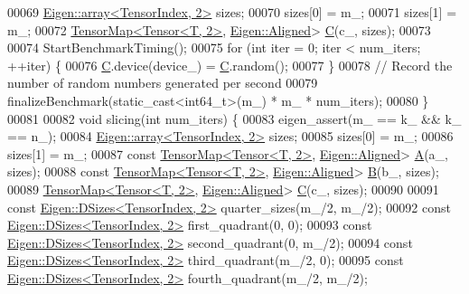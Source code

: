 \begin{DoxyCode}
00069     \hyperlink{class_eigen_1_1array}{Eigen::array<TensorIndex, 2>} sizes;
00070     sizes[0] = m\_;
00071     sizes[1] = m\_;
00072     \hyperlink{class_eigen_1_1_tensor_map}{TensorMap<Tensor<T, 2>}, \hyperlink{group__enums_gga45fe06e29902b7a2773de05ba27b47a1ad37d4c71425bb286e9b4103830538fbf}{Eigen::Aligned}> 
      \hyperlink{group___core___module}{C}(c\_, sizes);
00073 
00074     StartBenchmarkTiming();
00075     \textcolor{keywordflow}{for} (\textcolor{keywordtype}{int} iter = 0; iter < num\_iters; ++iter) \{
00076       \hyperlink{group___core___module}{C}.device(device\_) = \hyperlink{group___core___module}{C}.random();
00077     \}
00078     \textcolor{comment}{// Record the number of random numbers generated per second}
00079     finalizeBenchmark(static\_cast<int64\_t>(m\_) * m\_ * num\_iters);
00080   \}
00081 
00082   \textcolor{keywordtype}{void} slicing(\textcolor{keywordtype}{int} num\_iters) \{
00083     eigen\_assert(m\_ == k\_ && k\_ == n\_);
00084     \hyperlink{class_eigen_1_1array}{Eigen::array<TensorIndex, 2>} sizes;
00085     sizes[0] = m\_;
00086     sizes[1] = m\_;
00087     \textcolor{keyword}{const} \hyperlink{class_eigen_1_1_tensor_map}{TensorMap<Tensor<T, 2>}, \hyperlink{group__enums_gga45fe06e29902b7a2773de05ba27b47a1ad37d4c71425bb286e9b4103830538fbf}{Eigen::Aligned}> 
      \hyperlink{group___core___module_class_eigen_1_1_matrix}{A}(a\_, sizes);
00088     \textcolor{keyword}{const} \hyperlink{class_eigen_1_1_tensor_map}{TensorMap<Tensor<T, 2>}, \hyperlink{group__enums_gga45fe06e29902b7a2773de05ba27b47a1ad37d4c71425bb286e9b4103830538fbf}{Eigen::Aligned}> 
      \hyperlink{group___core___module_class_eigen_1_1_matrix}{B}(b\_, sizes);
00089     \hyperlink{class_eigen_1_1_tensor_map}{TensorMap<Tensor<T, 2>}, \hyperlink{group__enums_gga45fe06e29902b7a2773de05ba27b47a1ad37d4c71425bb286e9b4103830538fbf}{Eigen::Aligned}> 
      \hyperlink{group___core___module}{C}(c\_, sizes);
00090 
00091     \textcolor{keyword}{const} \hyperlink{struct_eigen_1_1_d_sizes}{Eigen::DSizes<TensorIndex, 2>} quarter\_sizes(m\_/2, m\_/2);
00092     \textcolor{keyword}{const} \hyperlink{struct_eigen_1_1_d_sizes}{Eigen::DSizes<TensorIndex, 2>} first\_quadrant(0, 0);
00093     \textcolor{keyword}{const} \hyperlink{struct_eigen_1_1_d_sizes}{Eigen::DSizes<TensorIndex, 2>} second\_quadrant(0, m\_/2);
00094     \textcolor{keyword}{const} \hyperlink{struct_eigen_1_1_d_sizes}{Eigen::DSizes<TensorIndex, 2>} third\_quadrant(m\_/2, 0);
00095     \textcolor{keyword}{const} \hyperlink{struct_eigen_1_1_d_sizes}{Eigen::DSizes<TensorIndex, 2>} fourth\_quadrant(m\_/2, m\_/2);

\end{DoxyCode}
